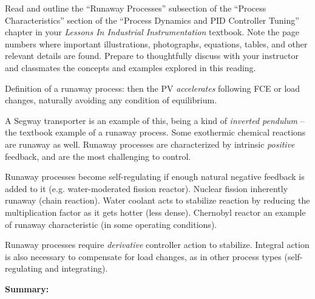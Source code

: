 

Read and outline the ``Runaway Processes'' subsection of the ``Process Characteristics'' section of the ``Process Dynamics and PID Controller Tuning'' chapter in your {\it Lessons In Industrial Instrumentation} textbook.  Note the page numbers where important illustrations, photographs, equations, tables, and other relevant details are found.  Prepare to thoughtfully discuss with your instructor and classmates the concepts and examples explored in this reading.














Definition of a runaway process: then the PV {\it accelerates} following FCE or load changes, naturally avoiding any condition of equilibrium.

\vskip 10pt

A Segway transporter is an example of this, being a kind of {\it inverted pendulum} -- the textbook example of a runaway process.  Some exothermic chemical reactions are runaway as well.  Runaway processes are characterized by intrinsic {\it positive} feedback, and are the most challenging to control.

\vskip 10pt

Runaway processes become self-regulating if enough natural negative feedback is added to it (e.g. water-moderated fission reactor).  Nuclear fission inherently runaway (chain reaction).  Water coolant acts to stabilize reaction by reducing the multiplication factor as it gets hotter (less dense).  Chernobyl reactor an example of runaway characteristic (in some operating conditions).

\vskip 10pt

Runaway processes require {\it derivative} controller action to stabilize.  Integral action is also necessary to compensate for load changes, as in other process types (self-regulating and integrating).

\vskip 10pt


\noindent
{\bf Summary:}

